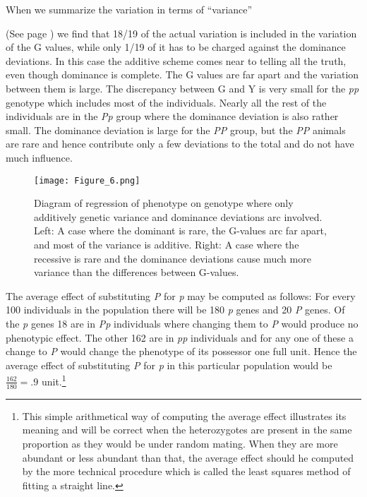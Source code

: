\noindent
When we summarize the variation in terms of ``variance'' {(See
page \pageref{page79}) we find that 18/19 of the actual variation is included in the
variation of the G values, while only 1/19 of it has to be charged against
the dominance deviations. In this case the additive scheme comes near to telling
all the truth, even though dominance is complete. The G values are far apart and
the variation between them is large. The discrepancy between G and Y is very
small for the \textit{pp} genotype which includes most of the individuals. Nearly
all the rest of the individuals are in the \textit{Pp} group where the dominance
deviation is also rather small. The dominance deviation is large for the
\textit{PP} group, but the \textit{PP} animals are rare and hence contribute only
a few deviations to the total and do not have much influence.

\begin{figure}
	\centering
    \texttt{[image: Figure\_6.png]}
    \caption{Diagram of regression of phenotype on genotype where only additively
    		 genetic variance and dominance deviations arc involved. Left: A case
    		 where the dominant is rare, the G-values arc far apart, and most of
    		 the variance is additive. Right: A case where the recessive is rare
    		 and the dominance deviations cause much more variance than the
    		 differences between G-values.}
    \label{fig:Lush_Figure_6}
\end{figure}

The average effect of substituting \textit{P} for \textit{p} may be computed as
follows: For every 100 individuals in the population there will be 180 \textit{p}
genes and 20 \textit{P} genes. Of the \textit{p} genes 18 are in \textit{Pp}
individuals where changing them to \textit{P} would produce no phenotypic effect.
The other 162 are in \textit{pp} individuals and for any one of these a change to
\textit{P} would change the phenotype of its possessor one full unit. Hence the
average effect of substituting \textit{P} for \textit{p} in this particular population
would be $\frac{162}{180} = .9$ unit.\footnote{This simple arithmetical way of
computing the average effect illustrates its meaning and will be correct when the
heterozygotes are present in the same proportion as they would be under random mating.
When they are more abundant or less abundant than that, the average effect should he
computed by the more technical procedure which is called the least squares method of
fitting a straight line.}

}
